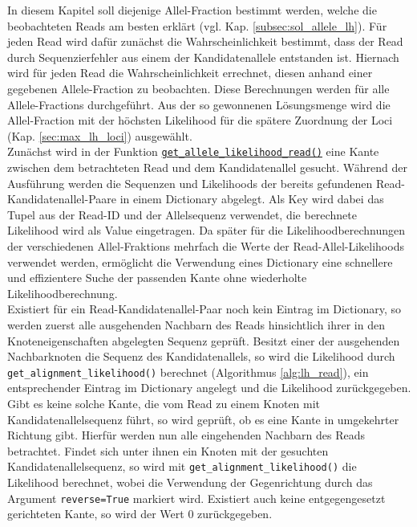 In diesem Kapitel soll diejenige Allel-Fraction bestimmt werden, welche die beobachteten Reads am besten erklärt (vgl. Kap. \ref{subsec:sol_allele_lh}). Für jeden Read wird dafür zunächst die Wahrscheinlichkeit bestimmt, dass der Read durch Sequenzierfehler aus einem der Kandidatenallele entstanden ist. Hiernach wird für jeden Read die Wahrscheinlichkeit errechnet, diesen anhand einer gegebenen Allele-Fraction zu beobachten. Diese Berechnungen werden für alle Allele-Fractions durchgeführt. Aus der so gewonnenen Lösungsmenge wird die Allel-Fraction mit der höchsten Likelihood für die spätere Zuordnung der Loci (Kap. \ref{sec:max_lh_loci}) ausgewählt. \\ 

Zunächst wird in der Funktion \hyperref[schritt9]{\lstinline|get_allele_likelihood_read()|\label{schritt9txt}} eine Kante zwischen dem betrachteten Read und dem Kandidatenallel gesucht. Während der Ausführung werden die Sequenzen und Likelihoods der bereits gefundenen Read-Kandidatenallel-Paare in einem Dictionary abgelegt. Als Key wird dabei das Tupel aus der Read-ID und der Allelsequenz verwendet, die berechnete Likelihood wird als Value eingetragen. Da später für die Likelihoodberechnungen der verschiedenen Allel-Fraktions mehrfach die Werte der Read-Allel-Likelihoods verwendet werden, ermöglicht die Verwendung eines Dictionary eine schnellere und effizientere Suche der passenden Kante ohne wiederholte Likelihoodberechnung. \\

Existiert für ein Read-Kandidatenallel-Paar noch kein Eintrag im Dictionary, so werden zuerst alle ausgehenden Nachbarn des Reads hinsichtlich ihrer in den Knoteneigenschaften abgelegten Sequenz geprüft. Besitzt einer der ausgehenden Nachbarknoten die Sequenz des Kandidatenallels, so wird die Likelihood durch \lstinline|get_alignment_likelihood()| berechnet (Algorithmus \ref{alg:lh_read}), ein entsprechender Eintrag im Dictionary angelegt und die Likelihood zurückgegeben.\\

Gibt es keine solche Kante, die vom Read zu einem Knoten mit Kandidatenallelsequenz führt, so wird geprüft, ob es eine Kante in umgekehrter Richtung gibt. Hierfür werden nun alle eingehenden Nachbarn des Reads betrachtet. Findet sich unter ihnen ein Knoten mit der gesuchten Kandidatenallelsequenz, so wird mit \lstinline|get_alignment_likelihood()| die Likelihood berechnet, wobei die Verwendung der Gegenrichtung durch das Argument \lstinline|reverse=True| markiert wird. Existiert auch keine entgegengesetzt gerichteten Kante, so wird der Wert $0$ zurückgegeben.\\

